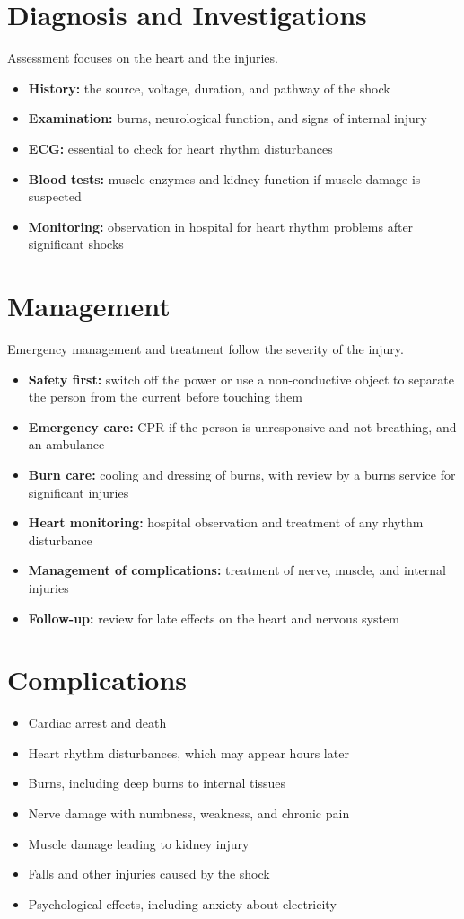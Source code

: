\section*{Diagnosis and Investigations}
Assessment focuses on the heart and the injuries.
\begin{itemize}
    \item \textbf{History:} the source, voltage, duration, and pathway of the shock
    \item \textbf{Examination:} burns, neurological function, and signs of internal injury
    \item \textbf{ECG:} essential to check for heart rhythm disturbances
    \item \textbf{Blood tests:} muscle enzymes and kidney function if muscle damage is suspected
    \item \textbf{Monitoring:} observation in hospital for heart rhythm problems after significant shocks
\end{itemize}

\section*{Management}
Emergency management and treatment follow the severity of the injury.
\begin{itemize}
    \item \textbf{Safety first:} switch off the power or use a non-conductive object to separate the person from the current before touching them
    \item \textbf{Emergency care:} CPR if the person is unresponsive and not breathing, and an ambulance
    \item \textbf{Burn care:} cooling and dressing of burns, with review by a burns service for significant injuries
    \item \textbf{Heart monitoring:} hospital observation and treatment of any rhythm disturbance
    \item \textbf{Management of complications:} treatment of nerve, muscle, and internal injuries
    \item \textbf{Follow-up:} review for late effects on the heart and nervous system
\end{itemize}

\section*{Complications}
\begin{itemize}
    \item Cardiac arrest and death
    \item Heart rhythm disturbances, which may appear hours later
    \item Burns, including deep burns to internal tissues
    \item Nerve damage with numbness, weakness, and chronic pain
    \item Muscle damage leading to kidney injury
    \item Falls and other injuries caused by the shock
    \item Psychological effects, including anxiety about electricity
\end{itemize}

